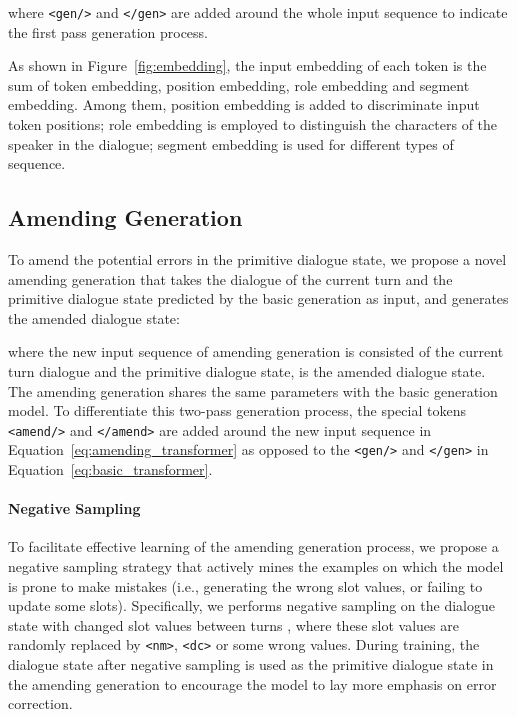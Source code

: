 \documentclass[11pt]{article}
\begin{document}
where \texttt{<gen/>} and \texttt{</gen>} are added around the whole input sequence to indicate the first pass generation process.

As shown in Figure~\ref{fig:embedding}, the input embedding of each token is the sum of token embedding, position embedding, role embedding and segment embedding. Among them, position embedding is added to discriminate input token positions; role embedding is employed to distinguish the characters of the speaker in the dialogue; segment embedding is used for different types of sequence.


\subsection{Amending Generation}\label{sec:amending_generation}

To amend the potential errors in the primitive dialogue state, we propose a novel amending generation that takes the dialogue of the current turn and the primitive dialogue state predicted by the basic generation as input, and generates the amended dialogue state:

where the new input sequence of amending generation is consisted of the current turn dialogue and the primitive dialogue state,  is the amended dialogue state. The amending generation shares the same parameters with the basic generation model. To differentiate this two-pass generation process, the special tokens \texttt{<amend/>} and \texttt{</amend>} are added around the new input sequence in Equation~\ref{eq:amending_transformer} as opposed to the \texttt{<gen/>} and \texttt{</gen>} in Equation~\ref{eq:basic_transformer}.


\paragraph{Negative Sampling} 
To facilitate effective learning of the amending generation process, we propose a negative sampling strategy that actively mines the examples on which the model is prone to make mistakes (i.e., generating the wrong slot values, or failing to update some slots).
Specifically, we performs negative sampling on the dialogue state with changed slot values between turns , where these slot values are randomly replaced by \texttt{<nm>}, \texttt{<dc>} or some wrong values. 
During training, the dialogue state after negative sampling is used as the primitive dialogue state  in the amending generation to encourage the model to lay more emphasis on error correction.
\end{document}
